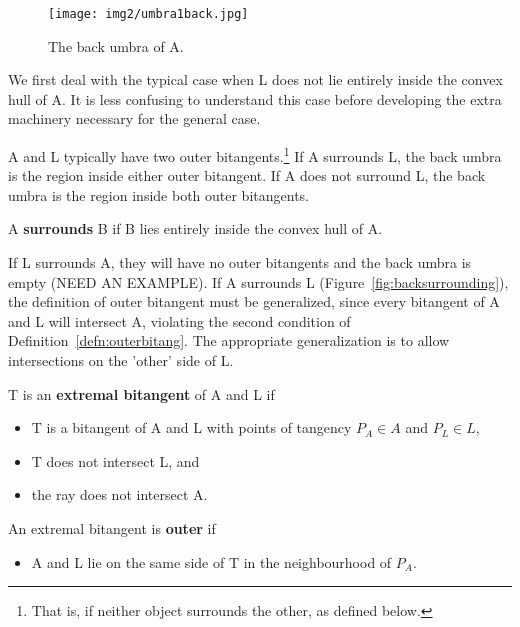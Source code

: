 \documentclass[9pt,twocolumn]{article}
\newif\ifSurrounding    %
\begin{document}
\begin{figure}
\begin{center}
\texttt{[image: img2/umbra1back.jpg]}
\end{center}
\caption{The back umbra of A.}
\label{fig:backumbra}
\end{figure}


\ifSurrounding
  We first deal with the typical case when L does not lie entirely inside the 
  convex hull of A.
  It is less confusing to understand this case before developing the extra machinery 
  necessary for the general case.


A and L typically have two outer bitangents.\footnote{That is, if neither object
  surrounds the other, as defined below.}
 If A surrounds L, the back umbra is the region inside either outer bitangent.
 If A does not surround L, the back umbra is the region inside both outer bitangents.

\begin{defn2}
A {\bf surrounds} B if B lies entirely inside the convex hull of A.
\end{defn2}

If L surrounds A,
they will have no outer bitangents and the back umbra is empty (NEED AN EXAMPLE).
If A surrounds L (Figure~\ref{fig:backsurrounding}),
the definition of outer bitangent must be generalized, 
since every bitangent of A and L will intersect A,
violating the second condition of Definition~\ref{defn:outerbitang}.
The appropriate generalization is to allow intersections on the 'other' side of L.

\begin{defn2}
T is an {\bf extremal bitangent} of A and L if 
\begin{itemize}
\item T is a bitangent of A and L with points of tangency $P_A \in A$ and $P_L \in L$,
\item T does not intersect L, and
\item the ray  does not intersect A.
\end{itemize}
An extremal bitangent is {\bf outer} if 
\begin{itemize}
\item A and L lie on the same side of T in the neighbourhood of $P_A$.
\end{itemize}
\end{defn2}
\end{document}

